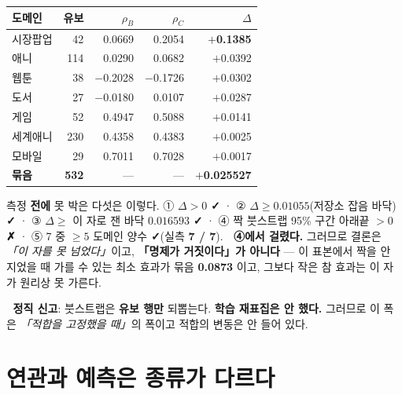 \documentclass[10pt]{article}
\begin{document}
\begin{center}\tsize
\begin{tabular}{lrrrr}
\toprule
도메인 & 유보 & $\rho_B$ & $\rho_C$ & $\Delta$ \\
\midrule
시장팝업 & 42 & 0.0669 & 0.2054 & \textbf{$+$0.1385} \\
애니 & 114 & 0.0290 & 0.0682 & $+$0.0392 \\
웹툰 & 38 & $-$0.2028 & $-$0.1726 & $+$0.0302 \\
도서 & 27 & $-$0.0180 & 0.0107 & $+$0.0287 \\
게임 & 52 & 0.4947 & 0.5088 & $+$0.0141 \\
세계애니 & 230 & 0.4358 & 0.4383 & $+$0.0025 \\
모바일 & 29 & 0.7011 & 0.7028 & $+$0.0017 \\
\midrule
\textbf{묶음} & \textbf{532} & --- & --- & \textbf{$+$0.025527} \\
\bottomrule
\end{tabular}
\end{center}


측정 \textbf{전에} 못 박은 다섯은 이렇다. ① $\Delta > 0$ \textbf{✓} ·
② $\Delta \ge 0.01055$(저장소 잡음 바닥) \textbf{✓} ·
③ $\Delta \ge$ 이 자로 잰 바닥 $0.016593$ \textbf{✓} ·
④ 짝 붓스트랩 95\% 구간 아래끝 $> 0$ \textbf{✗} ·
⑤ 7 중 $\ge 5$ 도메인 양수 \textbf{✓}(실측 \textbf{7 / 7}).
🔴 \textbf{④에서 걸렸다.} 그러므로 결론은 \emph{「이 자를 못 넘었다」}이고,
\textbf{「명제가 거짓이다」가 아니다} --- 이 표본에서 짝을 안 지었을 때 가를 수 있는
최소 효과가 묶음 \textbf{0.0873} 이고, 그보다 작은 참 효과는 이 자가 원리상 못 가른다.

🔴 \textbf{정직 신고}: 붓스트랩은 \textbf{유보 행만} 되뽑는다. \textbf{학습 재표집은 안 했다.}
그러므로 이 폭은 \emph{「적합을 고정했을 때」}의 폭이고 적합의 변동은 안 들어 있다.

\section{연관과 예측은 종류가 다르다}

\end{document}
